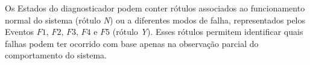 Os Estados do diagnosticador podem conter rótulos associados ao funcionamento normal do sistema (rótulo \textit{N}) ou a diferentes modos de falha, representados pelos Eventos $F1$, $F2$, $F3$, $F4$ e $F5$ (rótulo \textit{Y}). Esses rótulos permitem identificar quais falhas podem ter ocorrido com base apenas na observação parcial do comportamento do sistema.



